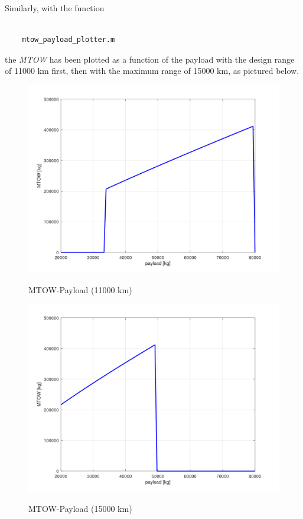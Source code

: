 \documentclass{article}
\begin{document}
\clearpage
Similarly, with the function \autocite{Airbus_replacement_repo}
\begin{verbatim}

    mtow_payload_plotter.m

\end{verbatim}
the \textit{MTOW} has been plotted as a function of the payload with the design
range of 11000 km first, then with the maximum range of 15000 km, as pictured below.

\begin{figure}[h!]
    \centering
    \includegraphics[width=\textwidth]{Sources/Plots_and_Pictures/MTOW_payload.png}
    \label{fig:MTOW_Payload_11}
    \caption{MTOW-Payload (11000 km)}
\end{figure}
\clearpage
\begin{figure}[h!]
    \centering
    \includegraphics[width=\textwidth]{Sources/Plots_and_Pictures/MTOW_payload_2.png}
    \label{MTOW_Payload_15}
    \caption{MTOW-Payload (15000 km)}
\end{figure}
\end{document}
